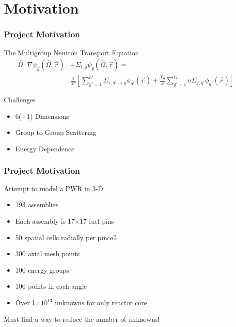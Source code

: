 \documentclass[fleqn]{beamer}
\providecommand{\e}[1]{\ensuremath{\times 10^{#1}}}
\begin{document}
  \section{Motivation}
  
  \begin{frame}
      \frametitle{Project Motivation}
      \begin{block}{The Multigroup Neutron Transport Equation}
      \begin{equation*}
    \begin{split}
    \hat{\Omega}\cdot \nabla \psi_g(\hat{\Omega},\vec{r}) 
    &+ \Sigma_{t, g}\psi_g(\hat{\Omega},\vec{r}) = \\
    &\frac{1}{4\pi}\left[\sum^G_{g\prime = 1}\Sigma_{s,g\prime\rightarrow 
        g}\phi_{g\prime}(\vec{r}) + \frac{\chi_g}{k}\sum^G_{g\prime = 
        1}\nu\Sigma_{f,g\prime}\phi_{g\prime}(\vec{r})\right]
    \label{eq:multigroup}
\end{split}
\end{equation*}
\end{block}
\begin{block}{Challenges}
    \begin{itemize}
        \item 6(+1) Dimensions
        \item Group to Group Scattering
        \item Energy Dependence
    \end{itemize}

\end{block}

  \end{frame}
  
  \begin{frame}
      \frametitle{Project Motivation}
      \begin{block}{Attempt to model a PWR in 3-D} 
          \begin{itemize}
              \item 193 assemblies
              \item Each assembly is 17$\times$17 fuel pins
              \item 50 spatial cells radially per pincell
              \item 300 axial mesh points
              \item 100 energy groups
              \item 100 points in each angle
              \item Over 1\e{13} unknowns for only reactor core
          \end{itemize}
      \end{block}
        Must find a way to reduce the number of unknowns!
  \end{frame}
  
\end{document}
